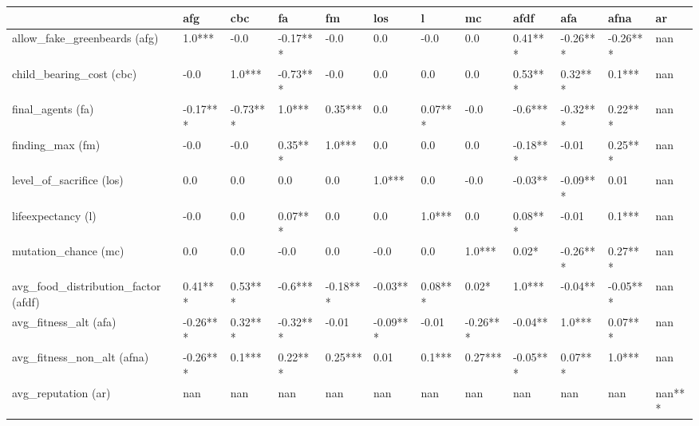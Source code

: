 \begin{tabular}{llllllllllll}
    \toprule
    {}                                     & afg      & cbc      & fa       & fm       & los      & l       & mc       & afdf     & afa      & afna     & ar     \\
    \midrule
    allow\_fake\_greenbeards (afg)         & 1.0***   & -0.0     & -0.17*** & -0.0     & 0.0      & -0.0    & 0.0      & 0.41***  & -0.26*** & -0.26*** & nan    \\
    child\_bearing\_cost (cbc)             & -0.0     & 1.0***   & -0.73*** & -0.0     & 0.0      & 0.0     & 0.0      & 0.53***  & 0.32***  & 0.1***   & nan    \\
    final\_agents (fa)                     & -0.17*** & -0.73*** & 1.0***   & 0.35***  & 0.0      & 0.07*** & -0.0     & -0.6***  & -0.32*** & 0.22***  & nan    \\
    finding\_max (fm)                      & -0.0     & -0.0     & 0.35***  & 1.0***   & 0.0      & 0.0     & 0.0      & -0.18*** & -0.01    & 0.25***  & nan    \\
    level\_of\_sacrifice (los)             & 0.0      & 0.0      & 0.0      & 0.0      & 1.0***   & 0.0     & -0.0     & -0.03**  & -0.09*** & 0.01     & nan    \\
    lifeexpectancy (l)                     & -0.0     & 0.0      & 0.07***  & 0.0      & 0.0      & 1.0***  & 0.0      & 0.08***  & -0.01    & 0.1***   & nan    \\
    mutation\_chance (mc)                  & 0.0      & 0.0      & -0.0     & 0.0      & -0.0     & 0.0     & 1.0***   & 0.02*    & -0.26*** & 0.27***  & nan    \\
    avg\_food\_distribution\_factor (afdf) & 0.41***  & 0.53***  & -0.6***  & -0.18*** & -0.03**  & 0.08*** & 0.02*    & 1.0***   & -0.04**  & -0.05***  & nan    \\
    avg\_fitness\_alt (afa)                & -0.26*** & 0.32***  & -0.32*** & -0.01    & -0.09*** & -0.01   & -0.26*** & -0.04**  & 1.0***   & 0.07***  & nan    \\
    avg\_fitness\_non\_alt (afna)          & -0.26*** & 0.1***   & 0.22***  & 0.25***  & 0.01     & 0.1***  & 0.27***  & -0.05*** & 0.07***  & 1.0***   & nan    \\
    avg\_reputation (ar)                   & nan      & nan      & nan      & nan      & nan      & nan     & nan      & nan      & nan      & nan      & nan*** \\
    \bottomrule
\end{tabular}
